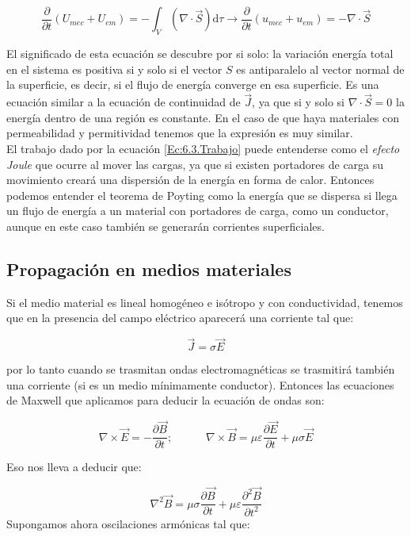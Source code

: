 \documentclass[12pt]{article}
\newcommand{\parciales}[2]{\frac{\partial #1}{\partial #2}}
\newcommand{\D}{\mathrm{d}}
\newcommand{\tquad}{\quad \quad \quad}
\begin{document}
\begin{equation}
\parciales{}{t} (U_{mec} + U_{em}) = - \int_V  (\nabla \cdot \vec{S}) \D \tau \longrightarrow \parciales{}{t} (u_{mec} + u_{em}) = - \nabla \cdot \vec{S}
\end{equation}

El significado de esta ecuación se descubre por si solo: la variación energía total en el sistema es positiva si y solo si el vector $S$ es antiparalelo al vector normal de la superficie, es decir, si el flujo de energía converge en esa superficie. Es una ecuación similar a la ecuación de continuidad de $\vec{J}$, ya que si y solo si $\nabla \cdot \vec{S}  = 0$ la energía dentro de una región es constante. En el caso de que haya materiales con permeabilidad y permitividad tenemos que la expresión es muy similar. \\

El trabajo dado por la ecuación \ref{Ec:6.3.Trabajo} puede entenderse como el \textit{efecto Joule} que ocurre al mover las cargas, ya que si existen portadores de carga su movimiento creará una dispersión de la energía en forma de calor. Entonces podemos entender el teorema de Poyting como la energía que se dispersa si llega un flujo de energía a un material con portadores de carga, como un conductor, aunque en este caso también se generarán corrientes superficiales. 

 

\subsection{Propagación en medios materiales}
 
Si el medio material es lineal homogéneo e isótropo y con conductividad, tenemos que en la presencia del campo eléctrico aparecerá una corriente tal que:

$$ \vec{J} = \sigma \vec{E} $$
 
por lo tanto cuando se trasmitan ondas electromagnéticas se trasmitirá también una corriente (si es un medio mínimamente conductor). Entonces las ecuaciones de Maxwell que aplicamos para deducir la ecuación de ondas son:

$$ \nabla \times \vec{E} = - \parciales{\vec{B}}{t}; \tquad \nabla \times \vec{B}  = \mu \varepsilon \parciales{\vec{E}}{t} + \mu \sigma \vec{E} $$

Eso nos lleva a deducir que:

\begin{equation}
\nabla^2 \vec{B} = \mu \sigma \parciales{\vec{B}}{t}  + \mu \varepsilon \parciales{^2 \vec{B}}{t^2}
\end{equation}
Supongamos ahora oscilaciones armónicas tal que:
\end{document}
